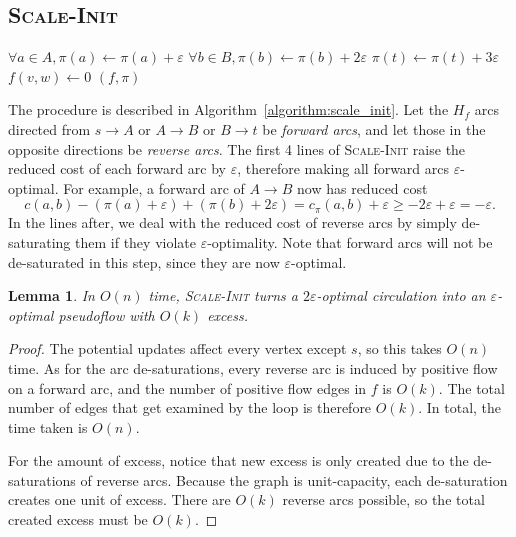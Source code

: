 \documentclass[11pt]{article}
\def\eps{\varepsilon}
\theoremstyle{plain}
\newtheorem{lemma}{Lemma}
\begin{document}
\begin{figure*}
\subsection{\textsc{Scale-Init}}

\begin{algorithm}
\caption{Scale Initialization}
\label{algorithm:scale_init}
\begin{algorithmic}[1]
	\State $\forall a \in A, \pi(a) \gets \pi(a) + \eps$
	\State $\forall b \in B, \pi(b) \gets \pi(b) + 2\eps$
	\State $\pi(t) \gets \pi(t) + 3\eps$
	\Statex %
		\If{$c_\pi(w, v) < -\eps$}
			\State $f(v, w) \gets 0$
		\EndIf
	\EndFor
	\State\Return $(f, \pi)$
\EndFunction
\end{algorithmic}
\end{algorithm}

The procedure is described in Algorithm~\ref{algorithm:scale_init}.
Let the $H_f$ arcs directed from $s \to A$ or $A \to B$ or $B \to t$ be
\emph{forward arcs}, and let those in the opposite directions be
\emph{reverse arcs}.
The first 4 lines of \textsc{Scale-Init} raise the reduced cost of each
forward arc by $\eps$, therefore making all forward arcs $\eps$-optimal.
For example, a forward arc of $A \to B$ now has reduced cost
\begin{equation*}
	c(a, b) - (\pi(a) + \eps) + (\pi(b) + 2\eps)
	= c_\pi(a, b) + \eps
	\geq -2\eps + \eps
	= -\eps.
\end{equation*}
In the lines after, we deal with the reduced cost of reverse arcs by simply
de-saturating them if they violate $\eps$-optimality.
Note that forward arcs will not be de-saturated in this step, since they are
now $\eps$-optimal.

\begin{lemma}
\label{lemma:scale_init}
In $O(n)$ time, \textsc{Scale-Init} turns a $2\eps$-optimal circulation into an
$\eps$-optimal pseudoflow with $O(k)$ excess.
\end{lemma}

\begin{proof}
The potential updates affect every vertex except $s$, so this takes $O(n)$
time.
As for the arc de-saturations, every reverse arc is induced by positive flow on
a forward arc, and the number of positive flow edges in $f$ is $O(k)$.
The total number of edges that get examined by the loop is therefore $O(k)$.
In total, the time taken is $O(n)$.

For the amount of excess, notice that new excess is only created due to the
de-saturations of reverse arcs.
Because the graph is unit-capacity, each de-saturation creates one unit of
excess.
There are $O(k)$ reverse arcs possible, so the total created excess must be
$O(k)$.
\end{proof}


\end{figure*}
\end{document}
